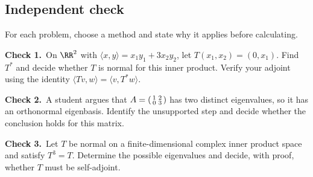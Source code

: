 \documentclass[10pt]{scrartcl}
\begin{document}
\subsection*{Independent check}
For each problem, choose a method and state why it applies before calculating.
\begin{prob}
  \textbf{Check 1.}\   On $\RR^2$ with $\langle x,y\rangle=x_1y_1+3x_2y_2$, let $T(x_1,x_2)=(0,x_1)$. Find $T^*$ and decide whether $T$ is normal for this inner product. Verify your adjoint using the identity $\langle Tv,w\rangle=\langle v,T^*w\rangle$.
\end{prob}
\begin{prob}
  \textbf{Check 2.}\   A student argues that $A=\begin{psmallmatrix}1&2\\0&3\end{psmallmatrix}$ has two distinct eigenvalues, so it has an orthonormal eigenbasis. Identify the unsupported step and decide whether the conclusion holds for this matrix.
\end{prob}
\begin{prob}
  \textbf{Check 3.}\   Let $T$ be normal on a finite-dimensional complex inner product space and satisfy $T^3=T$. Determine the possible eigenvalues and decide, with proof, whether $T$ must be self-adjoint.
\end{prob}

\clearpage
\end{document}
